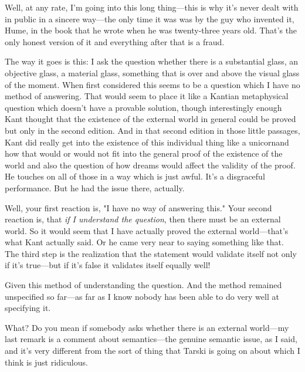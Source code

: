 Well, at any rate, I'm going into this long thing---this is why it's 
never dealt with in public in a sincere way---the only time it was was by 
the guy who invented it, Hume, in the book that he wrote when he was 
twenty-three years old. That's the only honest version of it and everything 
after that is a fraud. 

The way it goes is this: I ask the question whether there is a 
substantial glass, an objective glass, a material glass, something that is 
over and above the visual glass of the moment. When first considered 
this seems to be a question which I have no method of answering. That 
would seem to place it like a Kantian metaphysical question which 
doesn't have a provable solution, though interestingly enough Kant 
thought that the existence of the external world in general could be 
proved but only in the second edition. And in that second edition in 
those little passages, Kant did really get into the existence of this 
individual thing like a unicornand how that would or would not fit into 
the general proof of the existence of the world and also the question of 
how dreams would affect the validity of the proof. He touches on all of 
those in a way which is just awful. It's a disgraceful performance. But he 
had the issue there, actually. 

Well, your first reaction is, "I have no way of answering this." Your 
second reaction is, that \emph{if I understand the question}, then there must be 
an external world. So it would seem that I have actually proved the 
external world---that's what Kant actually said. Or he came very near 
to saying something like that. The third step is the realization that the 
statement would validate itself not only if it's true---but if it's false it 
validates itself equally well! 

 Given this method of understanding the question. And the 
method remained unspecified so far---as far as I know nobody has been 
able to do very well at specifying it. 

 What? Do you mean if somebody asks whether there is an 
external world---my last remark is a comment about semantics---the 
genuine semantic issue, as I said, and it's very different from the sort of 
thing that Tarski is going on about which I think is just ridiculous. 

